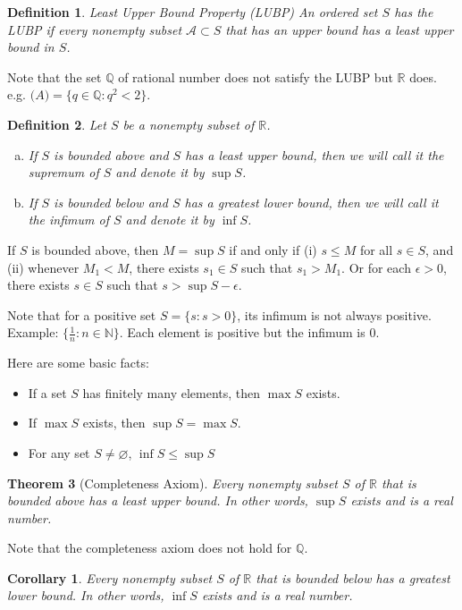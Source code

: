 \documentclass[12pt, lettersize]{book}
\newtheorem{thm}{Theorem}[section]
\newtheorem{dfn}[thm]{Definition}
\newtheorem{cor}{Corollary}[thm]
\newcommand{\R}{\mathbb{R}}
\newcommand{\N}{\mathbb{N}}
\newcommand{\Q}{\mathbb{Q}}
\let\emptyset\varnothing
\begin{document}
	\begin{dfn}
		Least Upper Bound Property (LUBP)\newline
		An ordered set $S$ has the LUBP if every nonempty subset $\mathcal{A}\subset S$ that has an upper bound has a least upper bound in $S$.
	\end{dfn}
	Note that the set $\Q$ of rational number does not satisfy the LUBP but $\R$ does. e.g. $\mathcal(A)=\{q\in\Q: q^2<2\}$.
	
	\begin{dfn}\label{def:4.3}
		Let $S$ be a nonempty subset of $\R$.
		\begin{enumerate}[(a)]
			\item If $S$ is bounded above and $S$ has a least upper bound, then we will call it the \emph{supremum} of $S$ and denote it by $\sup S$.
			\item If $S$ is bounded below and $S$ has a greatest lower bound, then we will call it the \emph{infimum} of $S$ and denote it by $\inf S$.
		\end{enumerate}
	\end{dfn}
	If $S$ is bounded above, then $M=\sup S$ if and only if (i) $s\leq M$ for all $s\in S$, and (ii) whenever $M_1<M$, there exists $s_1\in S$ such that $s_1>M_1$. Or for each $\epsilon>0$, there exists $s\in S$ such that $s>\sup S-\epsilon$.
	
	Note that for a positive set $S=\{s: s>0\}$, its infimum is not always positive. Example: $\{\frac{1}{n}: n\in\N\}$. Each element is positive but the infimum is $0$.
	
	Here are some basic facts:
	\begin{itemize}
		\item If a set $S$ has finitely many elements, then $\max S$ exists.
		\item If $\max S$ exists, then $\sup S=\max S$.
		\item For any set $S\neq\emptyset$, $\inf S\leq \sup S$
	\end{itemize}
	
	\begin{thm}[Completeness Axiom]\label{thm:4.4}
		Every nonempty subset $S$ of $\R$ that is bounded above has a least upper bound. In other words, $\sup S$ exists and is a real number.
	\end{thm}
	Note that the completeness axiom does not hold for $\Q$. 
	\begin{cor}
		Every nonempty subset $S$ of $\R$ that is bounded below has a greatest lower bound. In other words, $\inf S$ exists and is a real number.
	\end{cor}
	
\end{document}
